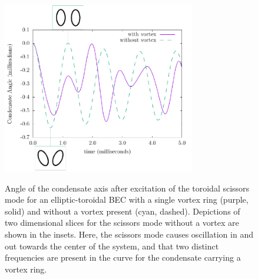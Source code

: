 \begin{figure}
\center \includegraphics[width=0.75\textwidth]{data/3d/scissors_plot.pdf}
\label{fig:scissors}
\caption{\label{fig:scissors} Angle of the condensate axis after excitation of the toroidal scissors mode for an elliptic-toroidal BEC with a single vortex ring (purple, solid) and without a vortex present (cyan, dashed).
Depictions of two dimensional slices for the scissors mode without a vortex are shown in the insets.
Here, the scissors mode causes oscillation in and out towards the center of the system, and that two distinct frequencies are present in the curve for the condensate carrying a vortex ring. }
\end{figure}

